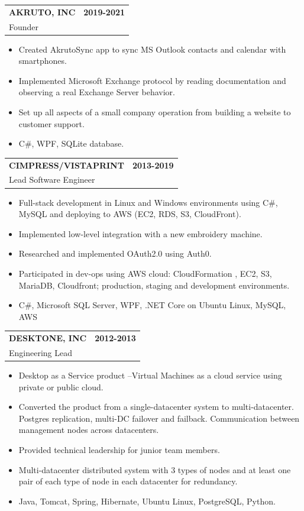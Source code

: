 \documentclass[11pt]{article}
\makeatletter
\newcommand{\jobheading}[4]{%
  \vspace{6pt}\begin{tabularx}{\textwidth}{@{}X r@{}}
    {\textbf{#1}} & {\textbf{#2}} \\
    {{\normalsize #3}\hspace{0.5em}{\color{muted}·}\hspace{0.5em}{\color{muted}#4}} & {} \\
  \end{tabularx}\vspace{2pt}
}
\makeatother
\begin{document}
\jobheading{AKRUTO, INC}{2019-2021}{Founder}{Needham, MA}
\begin{itemize}
\item Created AkrutoSync app to sync MS Outlook contacts and calendar with smartphones.
\item Implemented Microsoft Exchange protocol by reading documentation and observing a real Exchange Server behavior.
\item Set up all aspects of a small company operation from building a website to customer support.
\item C\#, WPF, SQLite database.
\end{itemize}

\jobheading{CIMPRESS/VISTAPRINT}{2013-2019}{Lead Software Engineer}{Waltham, MA}
\begin{itemize}
\item Full-stack development in Linux and Windows environments using C\#, MySQL and deploying to AWS (EC2, RDS, S3, CloudFront).
\item Implemented low-level integration with a new embroidery machine.
\item Researched and implemented OAuth2.0 using Auth0.
\item Participated in dev-ops using AWS cloud: CloudFormation , EC2, S3, MariaDB, Cloudfront; production, staging and development environments.
\item C\#, Microsoft SQL Server, WPF, .NET Core on Ubuntu Linux, MySQL, AWS
\end{itemize}

\jobheading{DESKTONE, INC}{2012-2013}{Engineering Lead}{Lexington, MA}
\begin{itemize}
\item Desktop as a Service product --Virtual Machines as a cloud service using private or public cloud.
\item Converted the product from a single-datacenter system to multi-datacenter. Postgres replication, multi-DC failover and failback. Communication between management nodes across datacenters.
\item Provided technical leadership for junior team members.
\item Multi-datacenter distributed system with 3 types of nodes and at least one pair of each type of node in each datacenter for redundancy.
\item Java, Tomcat, Spring, Hibernate, Ubuntu Linux, PostgreSQL, Python.
\end{itemize}
\end{document}
